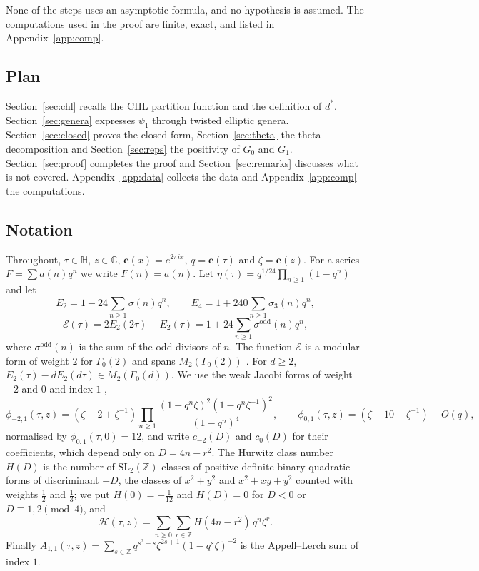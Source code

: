 \documentclass[11pt]{amsart}
\theoremstyle{definition}
\newcommand{\ZZ}{\mathbb{Z}}
\newcommand{\CC}{\mathbb{C}}
\newcommand{\HH}{\mathbb{H}}
\newcommand{\e}{\mathbf{e}}
\newcommand{\Hc}{\mathcal{H}}
\newcommand{\Ei}{\mathcal{E}}
\begin{document}
None of the steps uses an asymptotic formula, and no hypothesis is assumed. The computations used in the proof are finite, exact, and listed in Appendix~\ref{app:comp}.

\subsection*{Plan}
Section~\ref{sec:chl} recalls the CHL partition function and the definition of $d^*$. Section~\ref{sec:genera} expresses $\psi_1$ through twisted elliptic genera. Section~\ref{sec:closed} proves the closed form, Section~\ref{sec:theta} the theta decomposition and Section~\ref{sec:reps} the positivity of $G_0$ and $G_1$. Section~\ref{sec:proof} completes the proof and Section~\ref{sec:remarks} discusses what is not covered. Appendix~\ref{app:data} collects the data and Appendix~\ref{app:comp} the computations.

\subsection*{Notation}
Throughout, $\tau\in\HH$, $z\in\CC$, $\e(x)=e^{2\pi ix}$, $q=\e(\tau)$ and $\zeta=\e(z)$. For a series $F=\sum a(n)q^n$ we write $F(n)=a(n)$. Let $\eta(\tau)=q^{1/24}\prod_{n\ge1}(1-q^n)$ and let
\[
E_2=1-24\sum_{n\ge1}\sigma(n)q^n,\qquad E_4=1+240\sum_{n\ge1}\sigma_3(n)q^n,\]
\[\Ei(\tau)=2E_2(2\tau)-E_2(\tau)=1+24\sum_{n\ge1}\sigma^{\mathrm{odd}}(n)q^n,
\]
where $\sigma^{\mathrm{odd}}(n)$ is the sum of the odd divisors of $n$. The function $\Ei$ is a modular form of weight $2$ for $\Gamma_0(2)$ and spans $M_2(\Gamma_0(2))$ \cite{Ono04}. For $d\ge2$, $E_2(\tau)-dE_2(d\tau)\in M_2(\Gamma_0(d))$. We use the weak Jacobi forms of weight $-2$ and $0$ and index $1$ \cite[\S9]{EZ85},
\[
\phi_{-2,1}(\tau,z)=(\zeta-2+\zeta^{-1})\prod_{n\ge1}\frac{(1-q^n\zeta)^2(1-q^n\zeta^{-1})^2}{(1-q^n)^4},\qquad \phi_{0,1}(\tau,z)=(\zeta+10+\zeta^{-1})+O(q),
\]
normalised by $\phi_{0,1}(\tau,0)=12$, and write $c_{-2}(D)$ and $c_0(D)$ for their coefficients, which depend only on $D=4n-r^2$. The Hurwitz class number $H(D)$ is the number of $\mathrm{SL}_2(\ZZ)$-classes of positive definite binary quadratic forms of discriminant $-D$, the classes of $x^2+y^2$ and $x^2+xy+y^2$ counted with weights $\tfrac12$ and $\tfrac13$; we put $H(0)=-\tfrac1{12}$ and $H(D)=0$ for $D<0$ or $D\equiv1,2\pmod4$, and
\[
\Hc(\tau,z)=\sum_{n\ge0}\sum_{r\in\ZZ}H(4n-r^2)\,q^n\zeta^r .
\]
Finally $A_{1,1}(\tau,z)=\sum_{s\in\ZZ}q^{s^2+s}\zeta^{2s+1}(1-q^s\zeta)^{-2}$ is the Appell--Lerch sum of index $1$.
\end{document}
